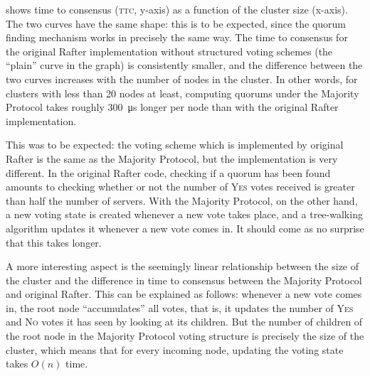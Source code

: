 \documentclass[12pt,chapterprefix=true,toc=bibliography,numbers=noendperiod,
               footnotes=multiple,twoside]{scrreprt}
\newcommand{\yes}{{\fontfamily{jkposn}\selectfont\textsc{Yes}}}
\newcommand{\no}{{\fontfamily{jkposn}\selectfont\textsc{No}}}
\begin{document}
 shows time to consensus (\textsc{ttc}, y-axis) as a function of the cluster size (x-axis). The two curves have the same shape: this is to be expected, since the quorum finding mechanism works in precisely the same way. The time to consensus for the original Rafter implementation without structured voting schemes (the \enquote{plain} curve in the graph) is consistently smaller, and the difference between the two curves increases with the number of nodes in the cluster. In other words, for clusters with less than 20 nodes at least, computing quorums under the Majority Protocol takes roughly \SI{300}{\micro\second} longer per node than with the original Rafter implementation.

This was to be expected: the voting scheme which is implemented by original Rafter is the same as the Majority Protocol, but the implementation is very different. In the original Rafter code, checking if a quorum has been found amounts to checking whether or not the number of \yes{} votes received is greater than half the number of servers. With the Majority Protocol, on the other hand, a new voting state is created whenever a new vote takes place, and a tree-walking algorithm updates it whenever a new vote comes in. It should come as no surprise that this takes longer.

A more interesting aspect is the seemingly linear relationship between the size of the cluster and the difference in time to consensus between the Majority Protocol and original Rafter. This can be explained as follows: whenever a new vote comes in, the root node \enquote{accumulates} all votes, that is, it updates the number of \yes{} and \no{} votes it has seen by looking at its children. But the number of children of the root node in the Majority Protocol voting structure is precisely the size of the cluster, which means that for every incoming node, updating the voting state takes \(O(n)\) time.

\end{document}

